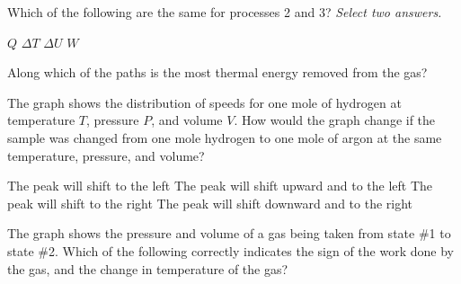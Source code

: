 \documentclass{../../../oss-ap12ibhl}
\begin{document}
\begin{questions}
  
  \question Which of the following are the same for processes 2 and 3?
  \emph{Select two answers.}
  \label{q-start}
  \begin{choices}
    \choice $Q$
    \choice $\Delta T$
    \choice $\Delta U$
    \choice $W$
  \end{choices}
    
  \question Along which of the paths is the most thermal energy removed from the
  gas?
  \label{q-end}
  \begin{choices}
    \end{choices}
    
  \question The graph shows the distribution of speeds for one mole of hydrogen
  at temperature $T$, pressure $P$, and volume $V$. How would the graph change
  if the sample was changed from one mole hydrogen to one mole of argon at the
  same temperature, pressure, and volume?

  \begin{minipage}{.37\textwidth}
  \end{minipage}
  \begin{minipage}{.6\textwidth}
    \begin{choices}
      \choice The peak will shift to the left
      \choice The peak will shift upward and to the left
      \choice The peak will shift to the right
      \choice The peak will shift downward and to the right
    \end{choices}
  \end{minipage}
  \vspace{.3in}
  
  \question The graph shows the pressure and volume of a gas being taken from
  state \#1 to state \#2. Which of the following correctly indicates the sign of
  the work done by the gas, and the change in temperature of the gas?


\end{questions}
\end{document}
